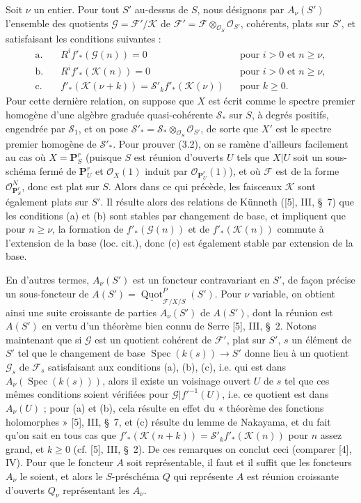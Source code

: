 Soit $\nu$ un entier. Pour tout $S'$ au-dessus de $S$, nous désignons par
$A_\nu(S')$ l'ensemble des quotients
$\mathcal G=\mathcal F'/\mathcal K$ de
$\mathcal F'=\mathcal F\otimes_{\mathcal O_S}\mathcal O_{S'}$, cohérents,
plats sur $S'$, et satisfaisant les conditions suivantes :
\begin{align*}
\text{a.}\quad &R^if'_*(\mathcal G(n))=0 &&\text{pour $i>0$ et $n\geq\nu$},\\
\text{b.}\quad &R^if'_*(\mathcal K(n))=0 &&\text{pour $i>0$ et $n\geq\nu$},\\
\text{c.}\quad &f'_*(\mathcal K(\nu+k))
=\mathcal S'_k f'_*(\mathcal K(\nu)) &&\text{pour $k\geq0$}.
\end{align*}
Pour cette dernière relation, on suppose que $X$ est écrit comme le spectre
premier homogène d'une algèbre graduée quasi-cohérente $\mathcal S_*$ sur $S$,
à degrés positifs, engendrée par $\mathcal S_1$, et on pose
$\mathcal S'_* =\mathcal S_*\otimes_{\mathcal O_S}\mathcal O_{S'}$, de sorte
que $X'$ est le spectre premier homogène de $\mathcal S'_*$. Pour prouver
(3.2), on se ramène d'ailleurs facilement au cas où $X=\mathbf P^r_S$ (puisque
$S$ est réunion d'ouverts $U$ tels que $X|U$ soit un sous-schéma fermé de
$\mathbf P^r_U$ et $\mathcal O_X(1)$ induit par
$\mathcal O_{\mathbf P^r_U}(1)$), et où $\mathcal F$ est de la forme
$\mathcal O_{\mathbf P^r_S}^{N}$, donc est plat sur $S$. Alors dans ce qui
précède, les faisceaux $\mathcal K$ sont également plats sur $S'$. Il résulte
alors des relations de Künneth ([5], III, \S~7) que les conditions (a) et (b)
sont stables par changement de base, et impliquent que pour $n\geq\nu$, la
formation de $f'_*(\mathcal G(n))$ et de $f'_*(\mathcal K(n))$ commute à
l'extension de la base (loc. cit.), donc (c) est également stable par extension
de la base.

En d'autres termes, $A_\nu(S')$ est un foncteur contravariant en $S'$, de façon
précise un sous-foncteur de
$A(S')=\underline{\operatorname{Quot}}^P_{\mathcal F/X/S}(S')$. Pour $\nu$
variable, on obtient ainsi une suite croissante de parties $A_\nu(S')$ de
$A(S')$, dont la réunion est $A(S')$ en vertu d'un théorème bien connu de
Serre [5], III, \S~2. Notons maintenant que si $\mathcal G$ est un quotient
cohérent de $\mathcal F'$, plat sur $S'$, $s$ un élément de $S'$ tel que le
changement de base $\operatorname{Spec}(k(s))\longrightarrow S'$ donne lieu à
un quotient $\mathcal G_s$ de $\mathcal F_s$ satisfaisant aux conditions (a),
(b), (c), i.e. qui est dans $A_\nu(\operatorname{Spec}(k(s)))$, alors il existe
un voisinage ouvert $U$ de $s$ tel que ces mêmes conditions soient vérifiées
pour $\mathcal G|f'^{-1}(U)$, i.e. ce quotient est dans $A_\nu(U)$ ; pour (a)
et (b), cela résulte en effet du « théorème des fonctions holomorphes » [5],
III, \S~7, et (c) résulte du lemme de Nakayama, et du fait qu'on sait en tous
cas que
$f'_*(\mathcal K(n+k))=\mathcal S'_k f'_*(\mathcal K(n))$
pour $n$ assez grand, et $k\geq0$ (cf. [5], III, \S~2). De ces remarques on
conclut ceci (comparer [4], IV). Pour que le foncteur $A$ soit représentable,
il faut et il suffit que les foncteurs $A_\nu$ le soient, et alors le
$S$-préschéma $Q$ qui représente $A$ est réunion croissante d'ouverts $Q_\nu$
représentant les $A_\nu$.

